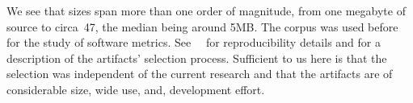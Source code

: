 We see that sizes span more than one order of magnitude, from one megabyte of
source to circa~47, the median being around 5MB. The corpus was used before for
the study of software metrics. See~\cite{Gil:Lalouche:2016}~\cite{Matteo:Cite:Gal:SecondPaper} for
reproducibility details and for a description of the artifacts' selection
process. Sufficient to us here is that the selection was independent of the
current research and that the artifacts are of considerable size, wide
use, and, development effort.
